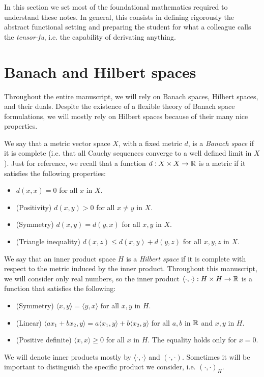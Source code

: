 In this section we set most of the foundational mathematics required to understand these notes. In general, this consists in defining rigorously the abstract functional setting and preparing the student for what a colleague calls the \emph{tensor-fu}, i.e. the capability of derivating anything.

\section{Banach and Hilbert spaces}\label{sec:banach-hilbert-spaces}
Throughout the entire manuscript, we will rely on Banach spaces, Hilbert spaces, and their duals. Despite the existence of a flexible theory of Banach space formulations, we will mostly rely on Hilbert spaces because of their many nice properties. 

\begin{definition}\label{def:banach-space}
    We say that a metric vector space $X$, with a fixed metric $d$, is a \emph{Banach space} if it is complete (i.e. that all Cauchy sequences converge to a well defined limit in $X$). Just for reference, we recall that a function $d:X\times X\to \mathbb{R}$ is a metric if it satisfies the following properties: 
    \begin{itemize}
        \item $d(x,x) = 0$ for all $x$ in $X$. 
        \item (Positivity) $d(x,y) > 0$ for all $x\neq y$ in $X$. 
        \item (Symmetry) $d(x,y) = d(y,x)$ for all $x,y$ in $X$. 
        \item (Triangle inequality) $d(x,z) \leq d(x,y) + d(y,z)$ for all $x,y,z$ in $X$. 
    \end{itemize}
\end{definition}
\begin{definition}\label{def:hilbert-space}
    We say that an inner product space $H$ is a \emph{Hilbert space} if it is complete with respect to the metric induced by the inner product. Throughout this manuscript, we will consider only real numbers, so the inner product $\langle\cdot, \cdot\rangle: H\times H \to \mathbb{R}$ is a function that satisfies the following: 
    \begin{itemize}
        \item (Symmetry) $\langle x,y\rangle = \langle y,x\rangle$ for all $x,y$ in $H$.
        \item (Linear) $\langle ax_1 + bx_2, y\rangle = a\langle x_1, y\rangle + b\langle x_2, y\rangle$ for all $a,b$ in $\mathbb{R}$ and $x,y$ in $H$. 
        \item (Positive definite) $\langle x, x\rangle \geq 0$ for all $x$ in $H$. The equality holds only for $x=0$. 
    \end{itemize}
    We will denote inner products mostly by $\langle\cdot, \cdot\rangle$ and $(\cdot, \cdot)$. Sometimes it will be important to distinguish the specific product we consider, i.e. $(\cdot, \cdot)_H$. 
\end{definition}
